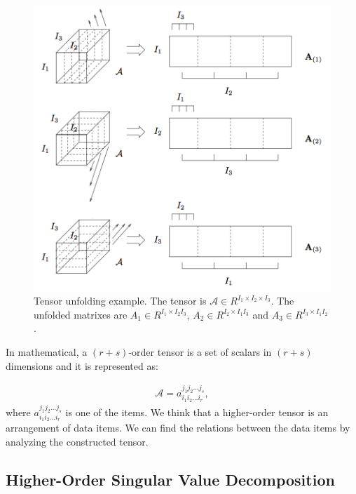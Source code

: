 	\begin{figure}[!htb]
	    \centering
	    \includegraphics[scale=0.9]{figure/tensor_definition}
	    \caption{Tensor unfolding example. The tensor is $\mathcal{A} \in R^{I_1 \times I_2 \times I_3}$.
	    		The unfolded matrixes are $A_1 \in R^{I_1 \times I_2I_3}$, $A_2 \in R^{I_2 \times I_1I_3}$
	    		and $A_3 \in R^{I_3 \times I_1I_2}$.}
	    \label{fig:tensor_fold}
	\end{figure}

In mathematical, a $(r+s)$-order tensor is a set of scalars 
in $(r+s)$ dimensions and it is represented as:

	\begin{equation}
	\label{equ:tensor}
	      \begin{aligned}
	        \mathcal{A} = a_{i_1i_2...i_r}^{j_1j_2...j_s},
	      \end{aligned}
    \end{equation}
	where $a_{i_1i_2...i_r}^{j_1j_2...j_s}$ is one of the items.
	We think that a higher-order tensor is an arrangement of
	data items. We can find the relations between the data items
	by analyzing the constructed tensor.

\subsection{Higher-Order Singular Value Decomposition}

